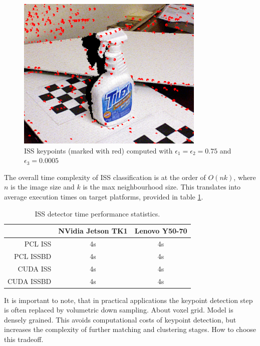 \begin{figure}[h]
\centering
\includegraphics[width=0.8\textwidth]{fig/ISS}
\caption{ISS keypoints (marked with red) computed with $\epsilon_1 =  \epsilon_2 = 0.75$ and $\epsilon_3 = 0.0005$ }
\label{fig:iss}
\end{figure}

The overall time complexity of ISS classification is at the order of $O(nk)$, where $n$ is the image size and $k$ is the max neighbourhood size. This translates into average execution times on target platforms, provided in table \ref{tab:issexec}.

\begin{table}[h]
\centering
\begin{tabular}{r || c | c}
& NVidia Jetson TK1 & Lenovo Y50-70 \\
 \hline
 \hline
 PCL ISS& 4s & 4s \\
 PCL ISSBD& 4s &  4s \\
 CUDA ISS& 4s & 4s \\
 CUDA ISSBD& 4s & 4s
\end{tabular}
\caption{ISS detector time performance statistics.}
\label{tab:issexec}
\end{table}

It is important to note, that in practical applications the keypoint detection step is often replaced by volumetric down sampling. About voxel grid. Model is densely grained. This avoids computational costs of keypoint detection, but increases the complexity of further matching and clustering stages. How to choose this tradeoff.

